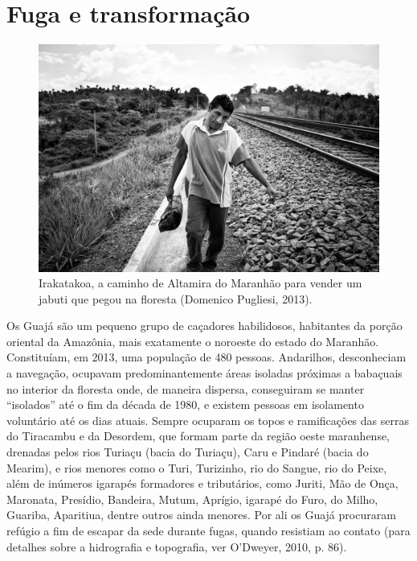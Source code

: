 
\chapter*{Fuga e transformação}\label{fuga-e-transformauxe7uxe3o}

\begin{figure}[H]
\centering
  \includegraphics[width=\textwidth]{./imgs/Irakatakoa_426}
\caption{Irakatakoa, a caminho de Altamira do Maranhão para vender um jabuti que pegou na
floresta (Domenico Pugliesi, 2013).}
\end{figure}

\noindent Os Guajá são um pequeno grupo de caçadores habilidosos, habitantes da
porção oriental da Amazônia, mais exatamente o noroeste do estado do
Maranhão. Constituíam, em 2013, uma população de 480 pessoas. Andarilhos, desconheciam a navegação, ocupavam
predominantemente áreas isoladas próximas a babaçuais no interior da
floresta onde, de maneira dispersa, conseguiram se manter ``isolados''
até o fim da década de 1980, e existem pessoas em isolamento voluntário
até os dias atuais. Sempre ocuparam os topos e ramificações das serras
do Tiracambu e da Desordem, que formam parte da região oeste maranhense,
drenadas pelos rios Turiaçu (bacia do Turiaçu), Caru e Pindaré (bacia do
Mearim), e rios menores como o Turi, Turizinho, rio do Sangue, rio do
Peixe, além de inúmeros igarapés formadores e tributários, como Juriti,
Mão de Onça, Maronata, Presídio, Bandeira, Mutum, Aprígio, igarapé do
Furo, do Milho, Guariba, Aparitiua, dentre outros ainda menores. Por ali
os Guajá procuraram refúgio a fim de escapar da sede durante fugas,
quando resistiam ao contato (para detalhes sobre a hidrografia e
topografia, ver O'Dweyer, 2010, p. 86).

